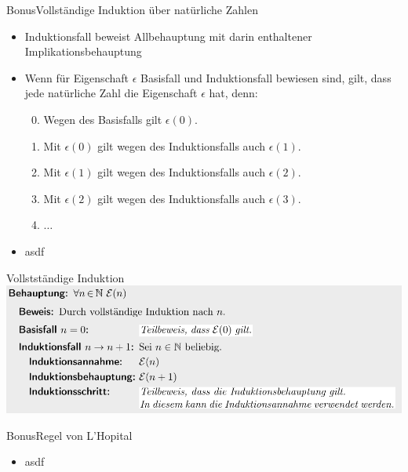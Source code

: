 \begin{frame}[allowframebreaks]{Bonus}{Vollständige Induktion über natürliche Zahlen\vspace{0.5cm}}
\begin{itemize}
  \end{itemize}
  \begin{itemize}
    \item Induktionsfall beweist Allbehauptung mit darin enthaltener Implikationsbehauptung 
    \item Wenn für Eigenschaft $\epsilon$ Basisfall und Induktionsfall bewiesen sind, gilt, dass jede natürliche Zahl die Eigenschaft $\epsilon$ hat, denn:
    \begin{enumerate}
      \setcounter{enumi}{-1}
      \item Wegen des Basisfalls gilt $\epsilon(0)$.
      \item Mit $\epsilon(0)$ gilt wegen des Induktionsfalls auch $\epsilon(1)$.
      \item Mit $\epsilon(1)$ gilt wegen des Induktionsfalls auch $\epsilon(2)$.
      \item Mit $\epsilon(2)$ gilt wegen des Induktionsfalls auch $\epsilon(3)$.
      \item $\ldots$
    \end{enumerate}
    \item asdf
  \end{itemize}
  \begin{example}{Vollstständige Induktion}
    \includegraphics[width=\textwidth]{./figures/vollstaendige_induktion.png}
  \end{example}
\end{frame}

\begin{frame}{Bonus}{Regel von L'Hopital}
  \begin{itemize}
    \item asdf
  \end{itemize}
\end{frame}
